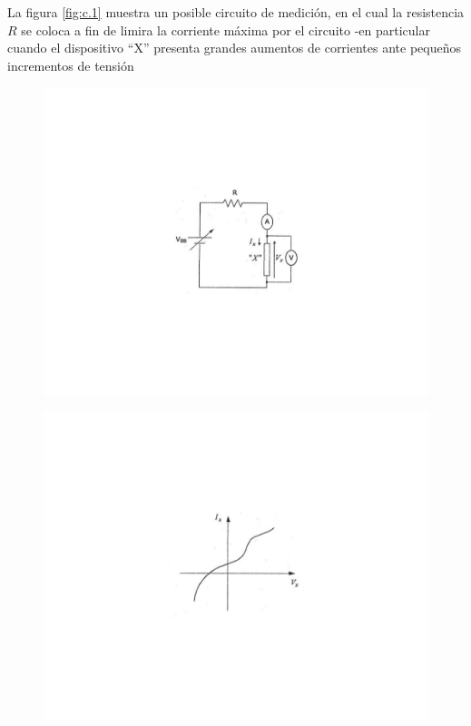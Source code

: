 \documentclass{book} %
\theoremstyle{definition}
\begin{document}
\begin{appendices}
La figura \ref{fig:c.1} muestra un posible circuito de medición, en el cual la resistencia $R$ se coloca a fin de limira la corriente máxima por el circuito -en particular cuando el dispositivo ``X'' presenta grandes aumentos de corrientes ante pequeños incrementos de tensión 

\begin{figure}[!htbp]
\centering
\begin{minipage}{.5\textwidth}
  \centering
  \includegraphics[scale=1]{figurac01.pdf}
  \label{fig:c.1}
\end{minipage}%
\begin{minipage}{.5\textwidth}
  \centering
  \includegraphics[scale=1]{figurac02.pdf}
  \label{fig:c.2}
\end{minipage}
\end{figure}


\end{appendices}
\end{document}
